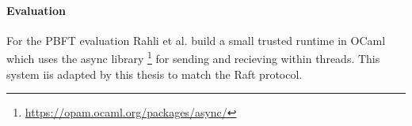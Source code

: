 \paragraph{Evaluation}
For the PBFT evaluation Rahli et al. build a small
trusted runtime in OCaml which uses the async library
\footnote{\url{https://opam.ocaml.org/packages/async/}}
for sending and recieving within threads. This system
iis adapted by this thesis to match the Raft protocol.


